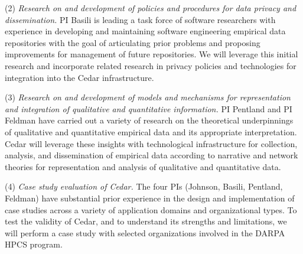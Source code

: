 (2) {\em Research on and development of policies and procedures for data
  privacy and dissemination.} PI Basili is leading a task force of
software researchers with experience in developing and maintaining software
engineering empirical data repositories with the goal of articulating prior 
problems and proposing improvements for management of future repositories. 
We will leverage this initial research and incorporate related research in 
privacy policies and technologies for integration into the Cedar infrastructure. 

(3) {\em Research on and development of models and mechanisms for
representation and integration of qualitative and quantitative
information.}  PI Pentland and PI Feldman have carried out a variety of
research on the theoretical underpinnings of qualitative and quantitative
empirical data and its appropriate interpretation.  Cedar will leverage
these insights with technological infrastructure for collection, analysis,
and dissemination of empirical data according to narrative and network theories 
for representation and analysis of qualitative and quantitative data. 

(4) {\em Case study evaluation of Cedar.}  The four PIs (Johnson, Basili,
Pentland, Feldman) have substantial prior experience in the design and
implementation of case studies across a variety of application domains and
organizational types. To test the validity of Cedar, and to understand its
strengths and limitations, we will perform a case study with selected
organizations involved in the DARPA HPCS program.






